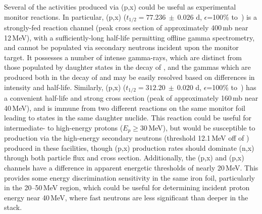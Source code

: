 Several of the activities produced via (p,x)  could be useful as experimental monitor reactions. 
In particular, (p,x) ($t_{1/2}=77.236~\pm~0.026$ d, $\epsilon$=100\% to \,\cite{Junde2011})  is a strongly-fed reaction channel (peak cross section of approximately 400\,mb near 12\,MeV), with a sufficiently-long half-life permitting offline gamma spectrometry,  and  cannot be populated via secondary neutrons incident upon the monitor target. 
It possesses a number of intense gamma-rays, which are distinct from those populated by daughter states in the decay of  , and the gammas which are produced both in the decay of   and   may be easily resolved based on differences in intensity and half-life. 
Similarly,  (p,x)  ($t_{1/2}=312.20~\pm~0.020$ d, $\epsilon$=100\% to \,\cite{Dong2014}) has a convenient half-life and strong cross section (peak of approximately 160\,mb near 40\,MeV), and is immune from two different reactions on the same monitor foil leading to states in the same daughter nuclide.
This reaction could be useful for intermediate- to high-energy protons ($E_p \geq$30\,MeV), but would be susceptible to production via the high-energy secondary neutrons  (threshold 12.1\,MeV off of ) produced in these facilities, though (p,x) production rates should dominate (n,x) through both particle flux and cross section. 
Additionally, the (p,x) and (p,x) channels have a difference in apparent energetic thresholds of nearly 20\,MeV.
This provides some energy discrimination sensitivity in the same iron foil, particularly in the 20--50\,MeV region, which could be useful for determining incident proton energy near 40\,MeV, where fast neutrons are less significant than deeper in the stack.







